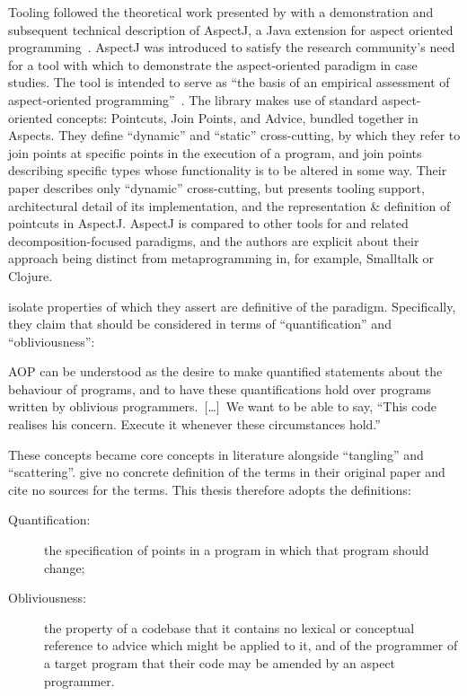 Tooling followed the theoretical work presented by \citet{kiczales1997aspect}
with a demonstration and subsequent technical description of AspectJ, a Java
extension for aspect oriented
programming~\cite{AspectJLanguageAndTools,aspectj_intro}. AspectJ was introduced
to satisfy the research community's need for a tool with which to demonstrate
the aspect-oriented paradigm in case studies. The tool is intended to serve as
``the basis of an empirical assessment of aspect-oriented
programming''~\cite{aspectj_intro}. The library makes use of standard
aspect-oriented concepts: Pointcuts, Join Points, and Advice, bundled together
in Aspects. They define ``dynamic'' and ``static'' cross-cutting, by which they
refer to join points at specific points in the execution of a program, and join
points describing specific types whose functionality is to be altered in some
way. Their paper describes only ``dynamic'' cross-cutting, but presents tooling
support, architectural detail of its implementation, and the representation \&
definition of pointcuts in AspectJ. AspectJ is compared to other tools for
\aspectorientation{} and related decomposition-focused paradigms, and the authors
are explicit about their approach being distinct from metaprogramming in, for
example, Smalltalk or Clojure.

\citet{filman2000aspect} isolate properties of \aspectorientation{} which they
assert are definitive of the paradigm. Specifically, they claim that \aop{}
should be considered in terms of ``quantification'' and ``obliviousness'':

\begin{displayquote}
AOP can be understood as the desire to make quantified statements about the
behaviour of programs, and to have these quantifications hold over programs
written by oblivious programmers.~[\ldots{}]~We want to be able to say, ``This
code realises his concern. Execute it whenever these circumstances hold.''
\end{displayquote}

These concepts became core concepts in \aspectorientation{} literature alongside
``tangling'' and ``scattering''. \citeauthor{filman2000aspect} give no concrete
definition of the terms in their original paper and cite no sources for the
terms. This thesis therefore adopts the definitions:

\begin{description}
  \item[Quantification:] the specification of points in a program in
  which that program should change;
  \item[Obliviousness:] the property of a codebase that it contains no lexical
  or conceptual reference to advice which might be applied to it, and of the
  programmer of a target program that their code may be amended by an aspect
  programmer.
\end{description}

